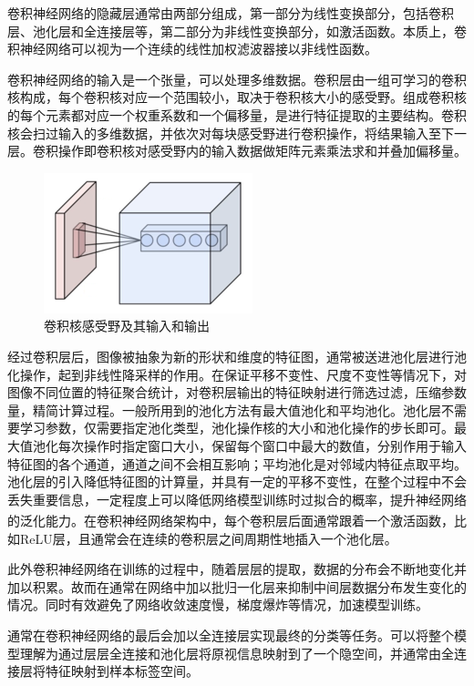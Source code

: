 卷积神经网络的隐藏层通常由两部分组成，第一部分为线性变换部分，包括卷积层、池化层和全连接层等，第二部分为非线性变换部分，如激活函数。本质上，卷积神经网络可以视为一个连续的线性加权滤波器接以非线性函数。

卷积神经网络的输入是一个张量，可以处理多维数据。卷积层由一组可学习的卷积核构成，每个卷积核对应一个范围较小，取决于卷积核大小的感受野。组成卷积核的每个元素都对应一个权重系数和一个偏移量，是进行特征提取的主要结构。卷积核会扫过输入的多维数据，并依次对每块感受野进行卷积操作，将结果输入至下一层。卷积操作即卷积核对感受野内的输入数据做矩阵元素乘法求和并叠加偏移量。

\begin{figure}[h]
	\centering
	\includegraphics[scale=1.2]{figures/8.png}
	\caption{卷积核感受野及其输入和输出}
	\label{fig:f8}
\end{figure}

经过卷积层后，图像被抽象为新的形状和维度的特征图，通常被送进池化层进行池化操作，起到非线性降采样的作用。在保证平移不变性、尺度不变性等情况下，对图像不同位置的特征聚合统计，对卷积层输出的特征映射进行筛选过滤，压缩参数量，精简计算过程。一般所用到的池化方法有最大值池化和平均池化。池化层不需要学习参数，仅需要指定池化类型，池化操作核的大小和池化操作的步长即可。最大值池化每次操作时指定窗口大小，保留每个窗口中最大的数值，分别作用于输入特征图的各个通道，通道之间不会相互影响；平均池化是对邻域内特征点取平均。池化层的引入降低特征图的计算量，并具有一定的平移不变性，在整个过程中不会丢失重要信息，一定程度上可以降低网络模型训练时过拟合的概率，提升神经网络的泛化能力。在卷积神经网络架构中\textsuperscript{\cite{p10}}，每个卷积层后面通常跟着一个激活函数，比如ReLU层，且通常会在连续的卷积层之间周期性地插入一个池化层。

此外卷积神经网络在训练的过程中，随着层层的提取，数据的分布会不断地变化并加以积累。故而在通常在网络中加以批归一化层来抑制中间层数据分布发生变化的情况。同时有效避免了网络收敛速度慢，梯度爆炸等情况，加速模型训练。

通常在卷积神经网络的最后会加以全连接层实现最终的分类等任务。可以将整个模型理解为通过层层全连接和池化层将原视信息映射到了一个隐空间，并通常由全连接层将特征映射到样本标签空间。

